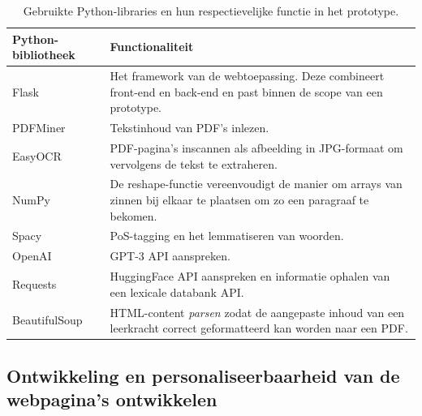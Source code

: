 \begin{center}
	\begin{table}[H]
	\begin{tabular}{ | m{4cm} | m{11cm} | } 
		\hline
		\textbf{Python-bibliotheek} & \textbf{Functionaliteit} \\
		\hline
		Flask					& Het framework van de webtoepassing. Deze combineert front-end en back-end en past binnen de scope van een prototype. \\ %
		\hline
		PDFMiner 				& Tekstinhoud van PDF's inlezen. \\ 
		\hline
		EasyOCR					& PDF-pagina's inscannen als afbeelding in JPG-formaat om vervolgens de tekst te extraheren. \\
		\hline
		NumPy 					& De reshape-functie vereenvoudigt de manier om arrays van zinnen bij elkaar te plaatsen om zo een paragraaf te bekomen. \\
		\hline		
		Spacy 					& PoS-tagging en het lemmatiseren van woorden. \\
		\hline
		OpenAI					& GPT-3 API aanspreken. \\
		\hline
		Requests				& HuggingFace API aanspreken en informatie ophalen van een lexicale databank API. \\
		\hline
		BeautifulSoup			& HTML-content \textit{parsen} zodat de aangepaste inhoud van een leerkracht correct geformatteerd kan worden naar een PDF. \\
		\hline
	\end{tabular}
	\caption{Gebruikte Python-libraries en hun respectievelijke functie in het prototype.}
	\label{table:python-libraries}
	\end{table}
\end{center}

\subsection{Ontwikkeling en personaliseerbaarheid van de webpagina's ontwikkelen}


